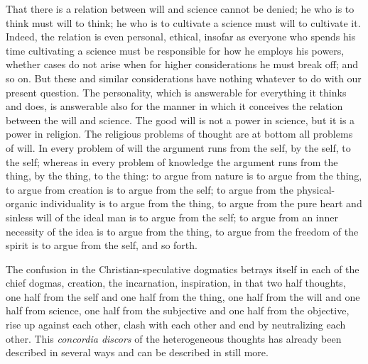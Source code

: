 \documentclass[12pt]{book}
\newcommand{\opage}[1]{\marginnote{\footnotesize\textit{[#1]}}}
\begin{document}
That there is a relation between will and science cannot be denied; he
who is to think must will to think; he who is to cultivate a science
must will to cultivate it. Indeed, the relation is even personal,
ethical, insofar as everyone who spends his time cultivating a science
must be responsible for how he employs his powers, whether cases do not
arise when for higher considerations he must break off; and so on. But
these and similar considerations have nothing whatever to do with our
present question. The personality, which is answerable for everything
it thinks and does, is answerable also for the manner in which it
conceives the relation between the will and science. The good will is
not a power in science, but it is a power in religion. The religious
problems of thought are at bottom all problems of will. In every problem
of will the argument runs from the self, by the self, to the self;
whereas in every problem of knowledge the argument runs from the thing,
by the thing, to the thing: to argue from nature is to argue from the
thing, to argue from creation is to argue from the self; to argue from
the physical-organic individuality is to argue from the thing, to argue
from the pure heart and sinless will of the ideal man is to argue from
the self; to argue
\opage{239}\setcounter{footnote}{0}%
from an inner necessity of the idea is to argue from the thing, to
argue from the freedom of the spirit is to argue from the self, and so
forth.

The confusion in the Christian-speculative dogmatics betrays itself in
each of the chief dogmas, creation, the incarnation, inspiration, in
that two half thoughts, one half from the self and one half from the
thing, one half from the will and one half from science, one half from
the subjective and one half from the objective, rise up against each
other, clash with each other and end by neutralizing each other. This
\textit{concordia discors} of the heterogeneous thoughts has already
been described in several ways and can be described in still more.
\end{document}
